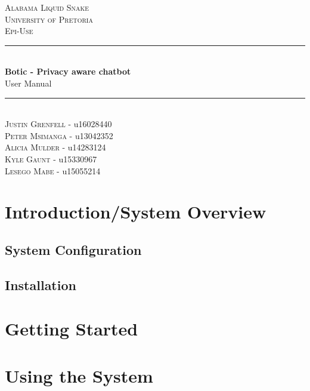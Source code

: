 \documentclass[11pt]{article}
\begin{document}
\begin{titlepage}
	\newcommand{\HRule}{\rule{\linewidth}{0.5mm}}
    \begin{center}
            
    	\textsc{\LARGE Alabama Liquid Snake}\\[0.8cm]
    	\textsc{\Large University of Pretoria}\\[0.5cm]
    	\textsc{\large Epi-Use}\\[0.5cm]
    
    	\HRule\\[0.4cm]
    	
    	{\huge\bfseries Botic - Privacy aware chatbot}\\[0.2cm]
    	
    	{\huge User Manual}\\[0.2cm]

    	\HRule\\[0.5cm]

	    \textsc{Justin Grenfell} - u16028440 \\[0cm]
	    \textsc{Peter Msimanga} - u13042352 \\[0cm]
	    \textsc{Alicia Mulder} - u14283124 \\[0cm]
	    \textsc{Kyle Gaunt} - u15330967 \\[0cm]
	    \textsc{Lesego Mabe} - u15055214 \\[0cm]
    
    \end{center}
\end{titlepage}
\tableofcontents
\newpage
\section{Introduction/System Overview}

\subsection{System Configuration}

\subsection{Installation}

\section {Getting Started}

\section{Using the System}
\end{document}
